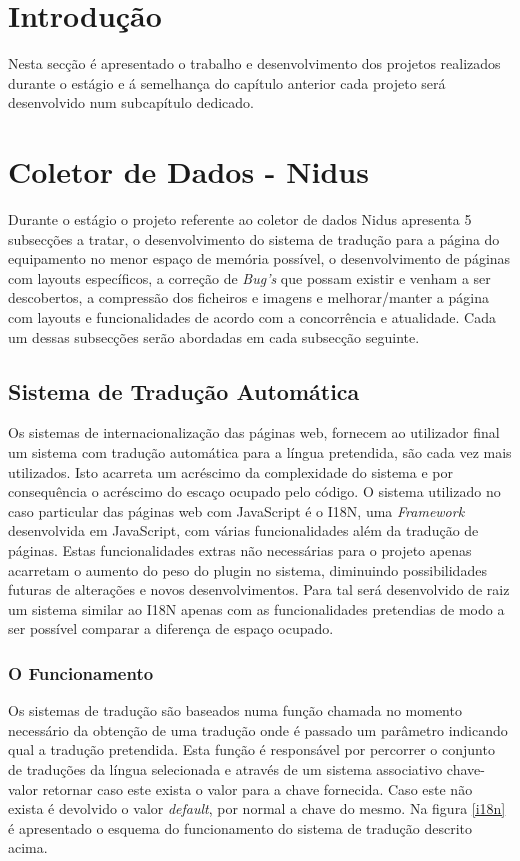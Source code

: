 \section{Introdução}
Nesta secção é apresentado o trabalho e desenvolvimento dos projetos realizados durante o estágio e á semelhança do capítulo anterior cada projeto será desenvolvido num subcapítulo dedicado.

\section{Coletor de Dados - Nidus} 
\par Durante o estágio o projeto referente ao coletor de dados Nidus apresenta 5 subsecções a tratar, o desenvolvimento do sistema de tradução para a página do equipamento no menor espaço de memória possível, o desenvolvimento de páginas com layouts específicos, a correção de \textit{Bug's} que possam existir e venham a ser descobertos, a compressão dos ficheiros e imagens e melhorar/manter a página com layouts e funcionalidades de acordo com a concorrência e atualidade. Cada um dessas subsecções serão abordadas em cada subsecção seguinte.

\subsection{Sistema de Tradução Automática}
\par Os sistemas de internacionalização das páginas web, fornecem ao utilizador final um sistema com tradução automática para a língua pretendida, são cada vez mais utilizados. Isto acarreta um acréscimo da complexidade do sistema e por consequência o acréscimo do escaço ocupado pelo código. O sistema utilizado no caso particular das páginas web com JavaScript é o I18N, uma \textit{Framework} desenvolvida em JavaScript, com várias funcionalidades além da tradução de páginas. Estas funcionalidades extras não necessárias para o projeto apenas acarretam o aumento do peso do plugin no sistema, diminuindo possibilidades futuras de alterações e novos desenvolvimentos. Para tal será desenvolvido de raiz um sistema similar ao I18N apenas com as funcionalidades pretendias de modo a ser possível comparar a diferença de espaço ocupado.


\subsubsection{O Funcionamento}
\par Os sistemas de tradução são baseados numa função chamada no momento necessário da obtenção de uma tradução onde é passado um parâmetro indicando qual a tradução pretendida. Esta função é responsável por percorrer o conjunto de traduções da língua selecionada e através de um sistema associativo chave-valor retornar caso este exista o valor para a chave fornecida. Caso este não exista é devolvido o valor \textit{default}, por normal a chave do mesmo. Na figura \ref{i18n} é apresentado o esquema do funcionamento do sistema de tradução descrito acima.

